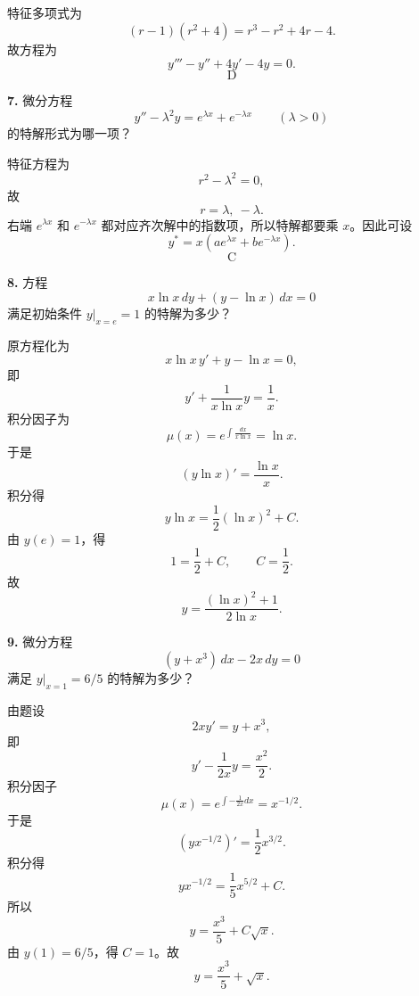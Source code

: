 \begin{solutionblock}
特征多项式为
\[
(r-1)(r^2+4)=r^3-r^2+4r-4.
\]
故方程为
\[
y'''-y''+4y'-4y=0.
\]
\[
\boxed{\text{D}}
\]
\end{solutionblock}

\begin{problemblock}
\textbf{7.} 微分方程
\[
y''-\lambda^2y=e^{\lambda x}+e^{-\lambda x}\qquad(\lambda>0)
\]
的特解形式为哪一项？
\end{problemblock}

\begin{solutionblock}
特征方程为
\[
r^2-\lambda^2=0,
\]
故
\[
r=\lambda,\ -\lambda.
\]
右端 \(e^{\lambda x}\) 和 \(e^{-\lambda x}\) 都对应齐次解中的指数项，所以特解都要乘 \(x\)。因此可设
\[
y^*=x(ae^{\lambda x}+be^{-\lambda x}).
\]
\[
\boxed{\text{C}}
\]
\end{solutionblock}

\begin{problemblock}
\textbf{8.} 方程
\[
x\ln x\,dy+(y-\ln x)\,dx=0
\]
满足初始条件 \(y|_{x=e}=1\) 的特解为多少？
\end{problemblock}

\begin{solutionblock}
原方程化为
\[
x\ln x\,y'+y-\ln x=0,
\]
即
\[
y'+\frac{1}{x\ln x}y=\frac1x.
\]
积分因子为
\[
\mu(x)=e^{\int\frac{dx}{x\ln x}}=\ln x.
\]
于是
\[
(y\ln x)'=\frac{\ln x}{x}.
\]
积分得
\[
y\ln x=\frac12(\ln x)^2+C.
\]
由 \(y(e)=1\)，得
\[
1=\frac12+C,\qquad C=\frac12.
\]
故
\[
\boxed{y=\frac{(\ln x)^2+1}{2\ln x}}.
\]
\end{solutionblock}

\begin{problemblock}
\textbf{9.} 微分方程
\[
(y+x^3)\,dx-2x\,dy=0
\]
满足 \(y|_{x=1}=6/5\) 的特解为多少？
\end{problemblock}

\begin{solutionblock}
由题设
\[
2x y'=y+x^3,
\]
即
\[
y'-\frac{1}{2x}y=\frac{x^2}{2}.
\]
积分因子
\[
\mu(x)=e^{\int-\frac{1}{2x}dx}=x^{-1/2}.
\]
于是
\[
(yx^{-1/2})'=\frac12x^{3/2}.
\]
积分得
\[
yx^{-1/2}=\frac15x^{5/2}+C.
\]
所以
\[
y=\frac{x^3}{5}+C\sqrt{x}.
\]
由 \(y(1)=6/5\)，得 \(C=1\)。故
\[
\boxed{y=\frac{x^3}{5}+\sqrt{x}}.
\]
\end{solutionblock}

